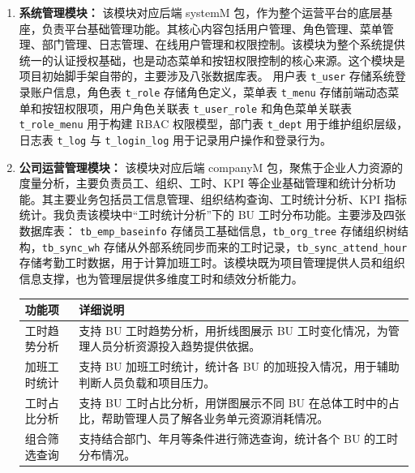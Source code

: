\begin{enumerate}[label=(\arabic*)]
	\item \textbf{系统管理模块：}
	该模块对应后端 systemM 包，作为整个运营平台的底层基座，负责平台基础管理功能。其核心内容包括用户管理、角色管理、菜单管理、部门管理、日志管理、在线用户管理和权限控制。该模块为整个系统提供统一的认证授权基础，也是动态菜单和按钮权限控制的核心来源。这个模块是项目初始脚手架自带的，主要涉及八张数据库表。
	用户表 \verb|t_user| 存储系统登录账户信息，角色表 \verb|t_role| 存储角色定义，菜单表 \verb|t_menu| 存储前端动态菜单和按钮权限项，用户角色关联表 \verb|t_user_role| 和角色菜单关联表 \verb|t_role_menu| 用于构建 RBAC 权限模型，部门表 \verb|t_dept| 用于维护组织层级，日志表 \verb|t_log| 与 \verb|t_login_log| 用于记录用户操作和登录行为。
	
	\item \textbf{公司运营管理模块：}
	该模块对应后端 companyM 包，聚焦于企业人力资源的度量分析，主要负责员工、组织、工时、KPI 等企业基础管理和统计分析功能。其主要业务包括员工信息管理、组织结构查询、工时统计分析、KPI 指标统计。我负责该模块中“工时统计分析”下的 BU 工时分布功能。主要涉及四张数据库表：
	\verb|tb_emp_baseinfo| 存储员工基础信息，\verb|tb_org_tree| 存储组织树结构，\verb|tb_sync_wh| 存储从外部系统同步而来的工时记录，\verb|tb_sync_attend_hour| 存储考勤工时数据，用于计算加班工时。该模块既为项目管理提供人员和组织信息支撑，也为管理层提供多维度工时和绩效分析能力。
	\begin{center}
		\label{tab:bu_workhour}
		{\songti{}\selectfont\fontsize{10.5pt}{12.6pt}\selectfont
			\begin{tabular}{p{3.5cm} p{10.5cm}}
				\toprule
				\textbf{功能项} & \textbf{详细说明} \\
				\midrule
				工时趋势分析 & 支持 BU 工时趋势分析，用折线图展示 BU 工时变化情况，为管理人员分析资源投入趋势提供依据。 \\
				加班工时统计 & 支持 BU 加班工时统计，统计各 BU 的加班投入情况，用于辅助判断人员负载和项目压力。 \\
				工时占比分析 & 支持 BU 工时占比分析，用饼图展示不同 BU 在总体工时中的占比，帮助管理人员了解各业务单元资源消耗情况。 \\
				组合筛选查询 & 支持结合部门、年月等条件进行筛选查询，统计各个 BU 的工时分布情况。 \\
				\bottomrule
			\end{tabular}
		}
	\end{center}
	

\end{enumerate}
